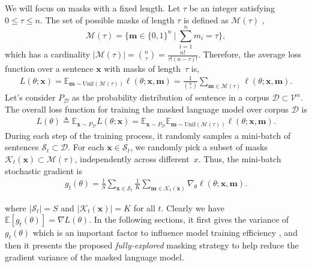 \documentclass{article} \usepackage{iclr2021_conference,times}
\theoremstyle{plain}
\newcommand{\EE}{\mathbb{E}}
\begin{document}
We will focus on masks with a fixed length. Let $\tau$ be an integer satisfying $0\leq\tau\leq n$. The set of possible masks of length $\tau$ is defined as $\mathcal{M}(\tau)$ ,
\[
\mathcal{M}(\tau) = \bigl\{\mathbf{m}\in\{0,1\}^n~|~ \textstyle\sum_{i=1}^n m_i=\tau\bigr\},
\]
which has a cardinality $|\mathcal{M}(\tau)|=\binom{n}{\tau}=\frac{n!}{\tau!(n-\tau)!}$.
Therefore, the average loss function over a sentence $\mathbf{x}$ with masks of length~$\tau$ is,
\begin{align}
L(\theta;\mathbf{x}) 
= \EE_{\mathbf{m}\sim\mathrm{Unif}(\mathcal{M}(\tau))} \ell(\theta;\mathbf{x}, \mathbf{m}) 
=\frac{1}{\binom{n}{\tau}}\sum_{\mathbf{m}\in\mathcal{M}(\tau)}\ell(\theta;\mathbf{x}, \mathbf{m}) .
\end{align}
Let's consider $P_{\mathcal{D}}$ as the probability distribution of sentence in a corpus $\mathcal{D}\subset\mathcal{V}^n$. 
The overall loss function for training the masked language model over corpus $\mathcal{D}$ is
\begin{align}
L(\theta) \triangleq 
\EE_{\mathbf{x}\sim P_{\mathcal{D}}} L(\theta;\mathbf{x}) 
= \EE_{\mathbf{x}\sim P_{\mathcal{D}}} \EE_{\mathbf{m}\sim\mathrm{Unif}(\mathcal{M}(\tau))} \ell(\theta;\mathbf{x}, \mathbf{m}). 
\end{align}
During each step of the training process, it randomly samples a mini-batch of sentences $\mathcal{S}_t\subset\mathcal{D}$.
For each $\mathbf{x}\in\mathcal{S}_t$, we randomly pick a subset of masks $\mathcal{K}_t(\mathbf{x})\subset\mathcal{M}(\tau)$, independently across different~$x$. Thus, the mini-batch stochastic gradient is
\begin{align}
g_t(\theta) = \frac{1}{S}\sum_{\mathbf{x}\in\mathcal{S}_t} \frac{1}{K}\sum_{\mathbf{m}\in\mathcal{K}_t(\mathbf{x})}\nabla_{\!\theta}\ell(\theta;\mathbf{x},\mathbf{m}).
\label{eq:full_grad}
\end{align}

where $|\mathcal{S}_t|=S$ and $|\mathcal{K}_t(\mathbf{x})|=K$ for all $t$.
Clearly we have $\EE[g_t(\theta)] = \nabla L(\theta)$. In the
following sections, it first gives the variance of $g_t(\theta)$ which is an important factor to influence model training efficiency \citep{xiao2014proximal, zhang2019stochastic}, and then it presents the proposed \emph{fully-explored} masking strategy to help reduce the gradient variance of the masked language model.


\vspace{-2mm}
\end{document}
